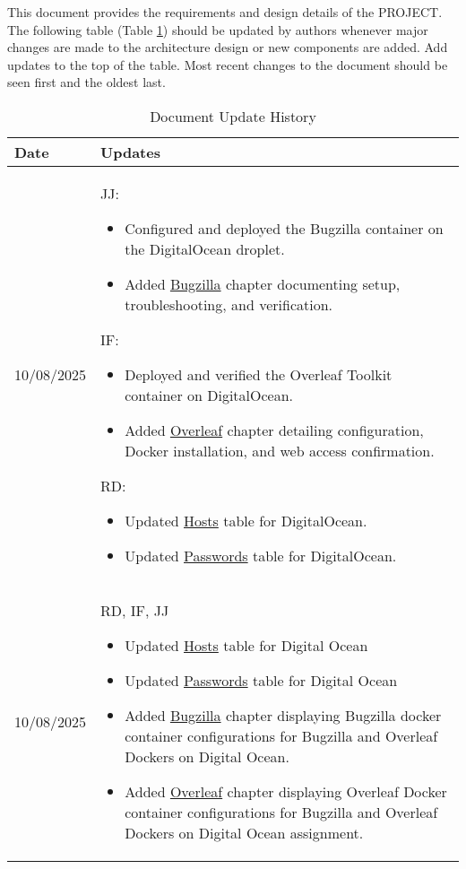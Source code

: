 This document provides the requirements and design details of the
PROJECT.  The following table (Table \ref{Table::UpdateHistory}) should be
updated by authors whenever major changes are made to the architecture
design or new components are added. Add updates to the top of the table.  
Most recent changes to the document should be seen first and the oldest 
last.

\begin{longtable}{|l||p{13.5cm}|}
\caption{Document Update History \label{Table::UpdateHistory}}\\
\hline
\textbf{Date} & \textbf{Updates} \\
\hline 
\endhead



10/08/2025 & 
{JJ:}
\begin{itemize}[topsep=0pt,itemsep=0pt,parsep=0pt,partopsep=0pt,leftmargin=12pt]
  \item Configured and deployed the Bugzilla container on the DigitalOcean droplet.
  \item Added \hyperref[Chapter::Bugzilla]{Bugzilla} chapter documenting setup, troubleshooting, and verification.
\end{itemize}

{IF:}
\begin{itemize}[topsep=0pt,itemsep=0pt,parsep=0pt,partopsep=0pt,leftmargin=12pt]
  \item Deployed and verified the Overleaf Toolkit container on DigitalOcean.
  \item Added \hyperref[Chapter::Overleaf]{Overleaf} chapter detailing configuration, Docker installation, and web access confirmation.
\end{itemize}

{RD:}
\begin{itemize}[topsep=0pt,itemsep=0pt,parsep=0pt,partopsep=0pt,leftmargin=12pt]
  \item Updated \hyperref[Chapter::Hosts]{Hosts} table for DigitalOcean.
  \item Updated \hyperref[Chapter::Passwords]{Passwords} table for DigitalOcean.

\end{itemize}
\\ \hline



10/08/2025 & RD, IF, JJ
\begin{itemize}[topsep=0pt,itemsep=0pt,parsep=0pt,partopsep=0pt,leftmargin=12pt]
    \item Updated \hyperref[Chapter::Hosts]{Hosts} table for Digital Ocean
    \item Updated \hyperref[Chapter::Passwords]{Passwords} table for Digital Ocean
    \item Added \hyperref[Chapter::Bugzilla]{Bugzilla} chapter displaying Bugzilla docker container configurations for Bugzilla and Overleaf Dockers on Digital Ocean.
    \item Added \hyperref[Chapter!Overleaf]{Overleaf} chapter displaying Overleaf Docker container configurations for Bugzilla and Overleaf Dockers on Digital Ocean assignment.


\end{itemize}
\end{longtable}
